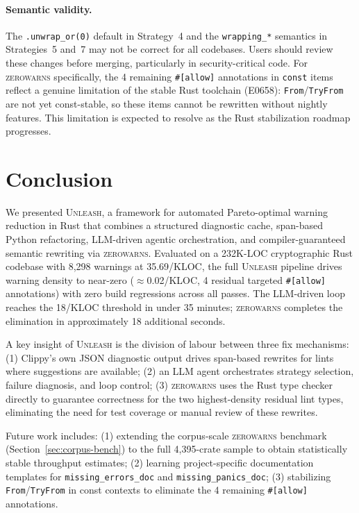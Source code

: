 \documentclass[sigconf,review,anonymous]{acmart}
\newcommand{\tool}{\textsc{Unleash}\xspace}
\newcommand{\zerowarns}{\textsc{zerowarns}\xspace}
\begin{document}
\paragraph{Semantic validity.}
The \texttt{.unwrap\_or(0)} default in Strategy~4 and the
\texttt{wrapping\_*} semantics in Strategies~5 and~7 may not be correct for
all codebases.
Users should review these changes before merging, particularly in
security-critical code.
For \zerowarns specifically, the 4 remaining \texttt{\#[allow]} annotations
in \texttt{const} items reflect a genuine limitation of the stable Rust
toolchain (E0658): \texttt{From}/\texttt{TryFrom} are not yet const-stable,
so these items cannot be rewritten without nightly features.
This limitation is expected to resolve as the Rust stabilization roadmap
progresses.

\section{Conclusion}\label{sec:conclusion}

We presented \tool, a framework for automated Pareto-optimal warning
reduction in Rust that combines a structured diagnostic cache, span-based
Python refactoring, LLM-driven agentic orchestration, and compiler-guaranteed
semantic rewriting via \zerowarns.
Evaluated on a 232K-LOC cryptographic Rust codebase with 8,298 warnings
at 35.69/KLOC, the full \tool pipeline drives warning density to near-zero
($\approx$0.02/KLOC, 4 residual targeted \texttt{\#[allow]} annotations)
with zero build regressions across all passes.
The LLM-driven loop reaches the 18/KLOC threshold in under 35 minutes;
\zerowarns completes the elimination in approximately 18 additional seconds.

A key insight of \tool is the division of labour between three fix
mechanisms: (1) Clippy's own JSON diagnostic output drives span-based
rewrites for lints where suggestions are available; (2) an LLM agent
orchestrates strategy selection, failure diagnosis, and loop control;
(3) \zerowarns uses the Rust type checker directly to guarantee correctness
for the two highest-density residual lint types, eliminating the need for
test coverage or manual review of these rewrites.

Future work includes: (1) extending the corpus-scale \zerowarns benchmark
(Section~\ref{sec:corpus-bench}) to the full 4,395-crate sample to obtain
statistically stable throughput estimates; (2) learning project-specific
documentation templates for \texttt{missing\_errors\_doc} and
\texttt{missing\_panics\_doc}; (3) stabilizing \texttt{From}/\texttt{TryFrom}
in const contexts to eliminate the 4 remaining \texttt{\#[allow]} annotations.



\end{document}
